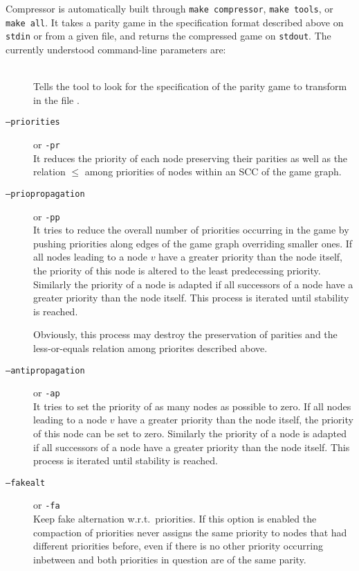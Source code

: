 Compressor is automatically built through \verb#make compressor#,
\verb#make tools#, or \verb#make all#. It takes a parity game in the specification format described above
on \texttt{stdin} or from a given file, and returns the compressed game on \texttt{stdout}. The currently
understood command-line parameters are:
\begin{description}
\item[] \ \\
   Tells the tool to look for the specification of the parity game to transform in the file
   .

\item[{\tt --priorities}] \enspace or {\tt -pr} \\
    It reduces the priority of each node preserving their parities as well as the relation $\le$
    among priorities of nodes within an SCC of the game graph.

\item[{\tt --priopropagation}] \enspace or {\tt -pp} \\
    It tries to reduce the overall number of priorities occurring in the game by pushing priorities
    along edges of the game graph overriding smaller ones. If all nodes leading to a node $v$ have a
    greater priority than the node itself, the priority of this node is altered to the least predecessing
    priority. Similarly the priority of a node is adapted if all successors of a node have a greater
    priority than the node itself. This process is iterated until stability is reached.

    Obviously, this process may destroy the preservation of parities and the less-or-equals relation among
    priorites described above.

\item[{\tt --antipropagation}] \enspace or {\tt -ap} \\
	It tries to set the priority of as many nodes as possible to zero. If all nodes leading to a node
	$v$ have a greater priority than the node itself, the priority of this node can be set to zero.
	Similarly the priority of a node is adapted if all successors of a node have a greater priority than
	the node itself. This process is iterated until stability is reached.

\item[{\tt  --fakealt}] \enspace or {\tt -fa} \\
    Keep fake alternation w.r.t.\ priorities. If this option is enabled the compaction of priorities
    never assigns the same priority to nodes that had different priorities before, even if there is
    no other priority occurring inbetween and both priorities in question are of the same parity.


\end{description}
